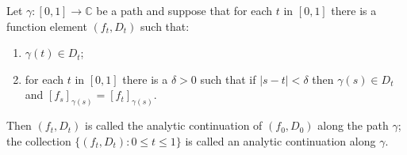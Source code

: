 Let $\gamma: [0, 1] \to \mathbb{C}$ be a path and suppose that for each $t$ in $[0, 1]$ there is a function element $(f_t, D_t)$ such that:
\begin{enumerate}
\item[(a)] $\gamma(t) \in D_t$;
\item[(b)] for each $t$ in $[0, 1]$ there is a $\delta > 0$ such that if $|s - t| < \delta$ then $\gamma(s) \in D_t$ and $[f_s]_{\gamma(s)} = [f_t]_{\gamma(s)}$.
\end{enumerate}
Then $(f_t, D_t)$ is called the analytic continuation of $(f_0, D_0)$ along the path $\gamma$; the collection $\{(f_t, D_t): 0 \leq t \leq 1\}$ is called an analytic continuation along $\gamma$.

